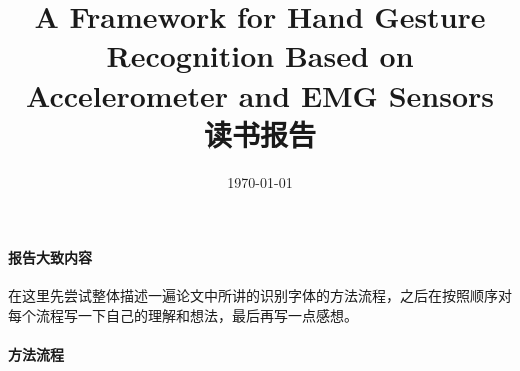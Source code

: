 \documentclass[10pt,a4paper]{article}
\begin{document}
\title{A Framework for Hand Gesture Recognition Based on Accelerometer and EMG Sensors \newline 读书报告}
\date{\today}
\maketitle
\paragraph{报告大致内容}
在这里先尝试整体描述一遍论文中所讲的识别字体的方法流程，之后在按照顺序对每个流程写一下自己的理解和想法，最后再写一点感想。

\paragraph{方法流程}
\end{document}
